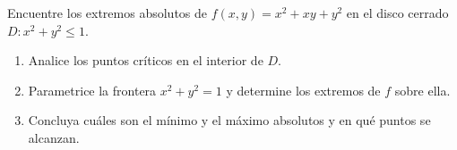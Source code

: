 Encuentre los extremos absolutos de $f(x, y) = x^2 + xy + y^2$ en el disco cerrado $D: x^2 + y^2 \leq 1$.
\begin{enumerate}
    \item Analice los puntos críticos en el interior de $D$.
    \item Parametrice la frontera $x^2 + y^2 = 1$ y determine los extremos de $f$ sobre ella.
    \item Concluya cuáles son el mínimo y el máximo absolutos y en qué puntos se alcanzan.
\end{enumerate}
